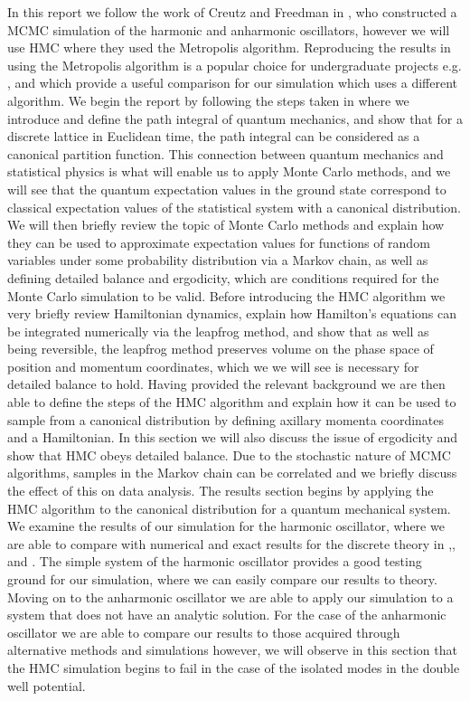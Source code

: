 \documentclass[12pt]{article}
\begin{document}
 In this report we follow the work of Creutz and Freedman in \cite{creutz_freedman_1981}, who constructed a MCMC simulation of the harmonic and anharmonic oscillators, however we will use HMC where they used the Metropolis algorithm. Reproducing the results in \cite{creutz_freedman_1981} using the Metropolis algorithm is a popular choice for undergraduate projects e.g. \cite{westbroek_king_vvedensky_durr_2017}, \cite{rodgers_raes} and \cite{slapik_serenone} which provide a useful comparison for our simulation which uses a different algorithm. We begin the report by following the steps taken in \cite{creutz_freedman_1981} where we introduce and define the path integral of quantum mechanics, and show that for a discrete lattice in Euclidean time, the path integral can be considered as a canonical partition function. This connection between quantum mechanics and statistical physics is what will enable us to apply Monte Carlo methods, and we will see that the quantum expectation values in the ground state correspond to classical expectation values of the statistical system with a canonical distribution. We will then briefly review the topic of Monte Carlo methods and explain how they can be used to approximate expectation values for functions of random variables under some probability distribution via a Markov chain, as well as defining detailed balance and ergodicity, which are conditions required for the Monte Carlo simulation to be valid. Before introducing the HMC algorithm we very briefly review Hamiltonian dynamics, explain how Hamilton's equations can be integrated numerically via the leapfrog method, and show that as well as being reversible, the leapfrog method preserves volume on the phase space of position and momentum coordinates, which we we will see is necessary for detailed balance to hold. Having provided the relevant background we are then able to define the steps of the HMC algorithm and explain how it can be used to sample from a canonical distribution by defining axillary momenta coordinates and a Hamiltonian. In this section we will also discuss the issue of ergodicity and show that HMC obeys detailed balance. Due to the stochastic nature of MCMC algorithms, samples in the Markov chain can be correlated and we briefly discuss the effect of this on data analysis. The results section begins by applying the HMC algorithm to the canonical distribution for a quantum mechanical system. We examine the results of our simulation for the harmonic oscillator, where we are able to compare with numerical and exact results for the discrete theory in \cite{creutz_freedman_1981},\cite{westbroek_king_vvedensky_durr_2017}, \cite{rodgers_raes} and \cite{slapik_serenone}. The simple system of the harmonic oscillator provides a good testing ground for our simulation, where we can easily compare our results to theory. Moving on to the anharmonic oscillator we are able to apply our simulation to a system that does not have an analytic solution. For the case of the anharmonic oscillator we are able to compare our results to those acquired through alternative methods \cite{blankenbecler_degrand_sugar_1980} and simulations \cite{rodgers_raes} however, we will observe in this section that the HMC simulation begins to fail in the case of the isolated modes in the double well potential. 
\end{document}

